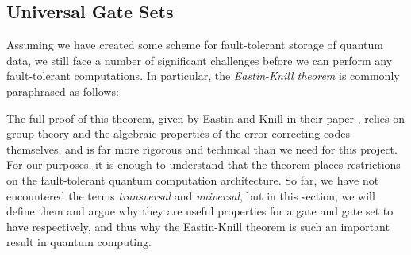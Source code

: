 \subsection{Universal Gate Sets}\label{subsec:universalgates}
Assuming we have created some scheme for fault-tolerant storage of quantum data, we still face a number of significant challenges before we can perform any fault-tolerant computations. In particular, the \emph{Eastin-Knill theorem} \cite{Eastin_2009,eastinknillwiki} is commonly paraphrased as follows:%
\begin{center}
\end{center}

The full proof of this theorem, given by Eastin and Knill in their paper \cite{Eastin_2009}, relies on group theory and the algebraic properties of the error correcting codes themselves, and is far more rigorous and technical than we need for this project. For our purposes, it is enough to understand that the theorem places restrictions on the fault-tolerant quantum computation architecture. So far, we have not encountered the terms \emph{transversal} and \emph{universal}, but in this section, we will define them and argue why they are useful properties for a gate and gate set to have respectively, and thus why the Eastin-Knill theorem is such an important result in quantum computing.

